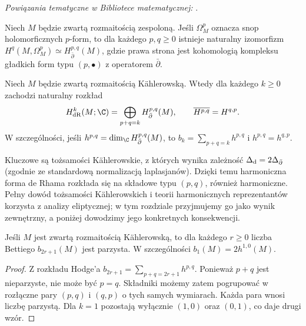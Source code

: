 \noindent\emph{Powiązania tematyczne w Bibliotece matematycznej:} .


\begin{twierdzenie}
Niech $M$ będzie zwartą rozmaitością zespoloną.
Jeśli $\Omega^p_M$ oznacza snop holomorficznych
$p$-form, to dla każdego $p,q\ge0$ istnieje
naturalny izomorfizm
$H^q(M,\Omega^p_M)\simeq H^{p,q}_{\bar\partial}(M)$,
gdzie prawa strona jest kohomologią kompleksu
gładkich form typu $(p,\bullet)$ z operatorem $\bar\partial$.
\end{twierdzenie}

\begin{twierdzenie}
\label{tw:ga9-hodge}
Niech $M$ będzie zwartą rozmaitością Kählerowską.
Wtedy dla każdego $k\ge0$ zachodzi naturalny rozkład
\[
 H^k_{\rm dR}(M;\C)
 =\bigoplus_{p+q=k}H^{p,q}_{\bar\partial}(M),
 \qquad \overline{H^{p,q}}=H^{q,p}.
\]
W szczególności, jeśli $h^{p,q}=\dim_\C H^{p,q}_{\bar\partial}(M)$,
to $b_k=\sum_{p+q=k}h^{p,q}$ i $h^{p,q}=h^{q,p}$.
\end{twierdzenie}

\begin{uwaga}
Kluczowe są tożsamości Kählerowskie, z których
wynika zależność $\Delta_{\rm d}=2\Delta_{\bar\partial}$
(zgodnie ze standardową normalizacją laplasjanów).
Dzięki temu harmoniczna forma de Rhama rozkłada się
na składowe typu $(p,q)$, również harmoniczne.
Pełny dowód tożsamości Kählerowskich i teorii
harmonicznych reprezentantów korzysta z analizy
eliptycznej; w tym rozdziale przyjmujemy go
jako wynik zewnętrzny, a poniżej dowodzimy jego
konkretnych konsekwencji.
\end{uwaga}

\begin{wniosek}
\label{wn:ga9-odd-betti}
Jeśli $M$ jest zwartą rozmaitością Kählerowską,
to dla każdego $r\ge0$ liczba Bettiego $b_{2r+1}(M)$
jest parzysta. W szczególności $b_1(M)=2h^{1,0}(M)$.
\end{wniosek}
\begin{proof}
Z rozkładu Hodge'a
$b_{2r+1}=\sum_{p+q=2r+1}h^{p,q}$.
Ponieważ $p+q$ jest nieparzyste, nie może być $p=q$.
Składniki możemy zatem pogrupować w rozłączne pary
$(p,q)$ i $(q,p)$ o tych samych wymiarach. Każda para
wnosi liczbę parzystą. Dla $k=1$ pozostają wyłącznie
$(1,0)$ oraz $(0,1)$, co daje drugi wzór.
\end{proof}

